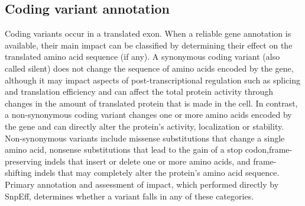 \subsection{Coding variant annotation}

Coding variants occur in a translated exon. When a reliable gene annotation is available, their main impact can be classified by determining their effect on the translated amino acid sequence (if any). A synonymous coding variant (also called silent) does not change the sequence of amino acids encoded by the gene, although it may impact aspects of post-transcriptional regulation such as splicing and translation efficiency and can affect the total protein activity through changes in the amount of translated protein that is made in the cell. In contrast, a non-synonymous coding variant changes one or more amino acids encoded by the gene and can directly alter the protein’s activity, localization or stability. Non-synonymous variants include missense substitutions that change a single amino acid, nonsense substitutions that lead to the gain of a stop codon,frame-preserving indels that insert or delete one or more amino acids, and frame-shifting indels that may completely alter the protein’s amino acid sequence. Primary annotation and assessment of impact, which performed directly by SnpEff, determines whether a variant falls in any of these categories.

